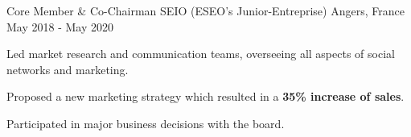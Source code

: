 

\begin{cventries}

  \cventry
    {Core Member \& Co-Chairman} %
    {SEIO (ESEO's Junior-Entreprise)} %
    {Angers, France} %
    {May 2018 - May 2020} %
    {
      \begin{cvitems} %
        \item {Led market research and communication teams, overseeing all aspects of social networks and marketing.}
        \item {Proposed a new marketing strategy which resulted in a \textbf{35\% increase of sales}.}
        \item {Participated in major business decisions with the board.}
      \end{cvitems}
    }
\end{cventries}
